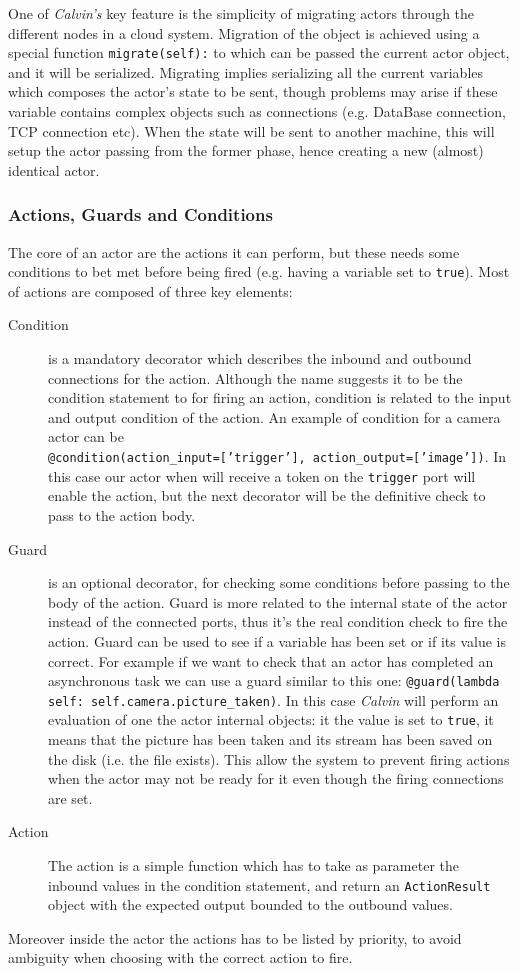 One of \textit{Calvin's} key feature is the simplicity of migrating actors through the
different nodes in a cloud system. Migration of the object is achieved using a special function
\texttt{migrate(self):} to which can be passed the current actor object, and it will be serialized.
Migrating implies serializing all the current variables which composes the actor's state to be sent, though
problems may arise if these variable contains complex objects such as connections (e.g. DataBase connection,
TCP connection etc). When the state will be sent to another machine, this will setup the actor
passing from the former phase, hence creating a new (almost) identical actor.

\subsubsection{Actions, Guards and Conditions}

The core of an actor are the actions it can perform, but these needs some conditions to bet met
before being fired (e.g. having a variable set to \texttt{true}). Most of actions are composed of three
key elements:

\begin{description}
    \item[Condition] is a mandatory decorator which describes the inbound and outbound connections for the action.
    Although the name suggests it to be the condition statement to for firing an action, condition is related to the
    input and output condition of the action. An example of condition for a camera actor can be \\
    \texttt{@condition(action\_input=['trigger'], action\_output=['image'])}. In this case our actor when will receive a token
    on the \texttt{trigger} port will enable the action, but the next decorator will be the definitive check to pass to the action
    body.
    \item[Guard]  is an optional decorator, for checking some conditions before passing to the body of the action.
    Guard is more related to the internal state of the actor instead of the connected ports, thus it's the real condition
    check to fire the action. Guard can be used to see if a variable has been set or if its value is correct. For example
    if we want to check that an actor has completed an asynchronous task we can use a guard similar to this one:
    \texttt{@guard(lambda self: self.camera.picture\_taken)}. In this case \textit{Calvin} will perform an evaluation
    of one the actor internal objects: it the value is set to \texttt{true}, it means that the picture has been taken and
    its stream has been saved on the disk (i.e. the file exists). This allow the system to prevent firing actions
    when the actor may not be ready for it even though the firing connections are set.
    \item[Action] The action is a simple function which has to take as parameter the inbound values in the condition
    statement, and return an \texttt{ActionResult} object with the expected output bounded to the outbound values.

\end{description}

Moreover inside the actor the actions has to be listed by priority, to avoid ambiguity
when choosing with the correct action to fire.
